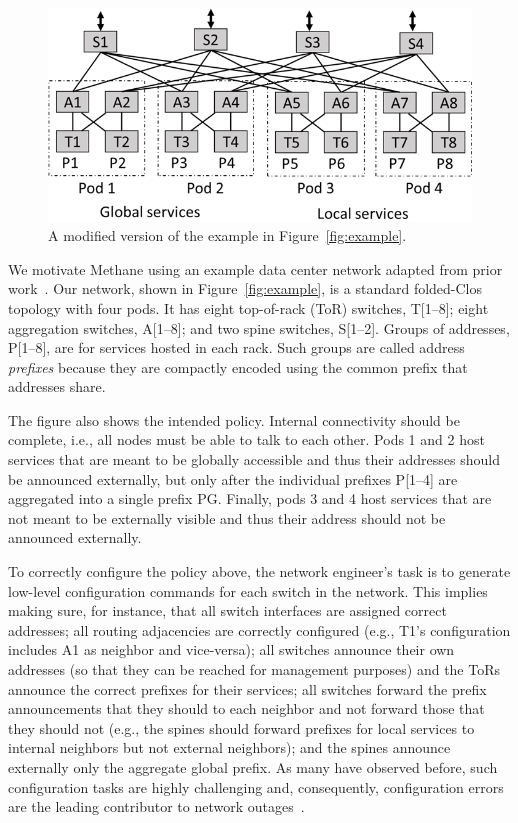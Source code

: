 \documentclass{sig-alternate-10pt}
\newcommand{\sysname}{{\small \sf Methane}\xspace}
\begin{document}
\begin{figure}[t!]
  \centering
  \includegraphics[width=\columnwidth]{figures/example2}
  \caption{A modified version of the example in Figure~\ref{fig:example}.}
  \label{fig:example2}
  \vspace{-1em}
\end{figure}

We motivate \sysname using an example data center network adapted from prior work~\cite{propane}. Our network, shown in Figure~\ref{fig:example}, is a standard folded-Clos topology with four pods. It has eight top-of-rack (ToR) switches, T[1--8]; eight aggregation switches, A[1--8]; and two spine switches, S[1--2]. Groups of addresses, P[1--8], are for services hosted in each rack. Such groups are called address {\em prefixes} because they are compactly encoded using the common prefix that addresses share.

The figure also shows the intended policy. Internal connectivity should be complete, i.e., all nodes must be able to talk to each other. Pods 1 and 2 host services that are meant to be globally accessible and thus their addresses should be announced externally, but only after the individual prefixes P[1--4] are aggregated into a single prefix PG. Finally, pods 3 and 4 host services that are not meant to be externally visible and thus their address should not be announced externally.

To correctly configure the policy above, the network engineer's task is to generate low-level configuration commands for each switch in the network. This implies making sure, for instance, that all switch interfaces are assigned correct addresses; all routing adjacencies are correctly configured (e.g., T1's configuration includes A1 as neighbor and vice-versa); all switches announce their own addresses (so that they can be reached for management purposes) and the ToRs announce the correct prefixes for their services; all switches  forward the prefix announcements that they should to each neighbor and not forward those that they should not (e.g., the spines should forward prefixes for local services to internal neighbors but not external neighbors); and the spines announce externally only the aggregate global prefix. As many have observed before, such configuration tasks are highly challenging and, consequently, configuration errors are the leading contributor to network outages~\cite{x,y,z,batfish,propane}.
\end{document}
